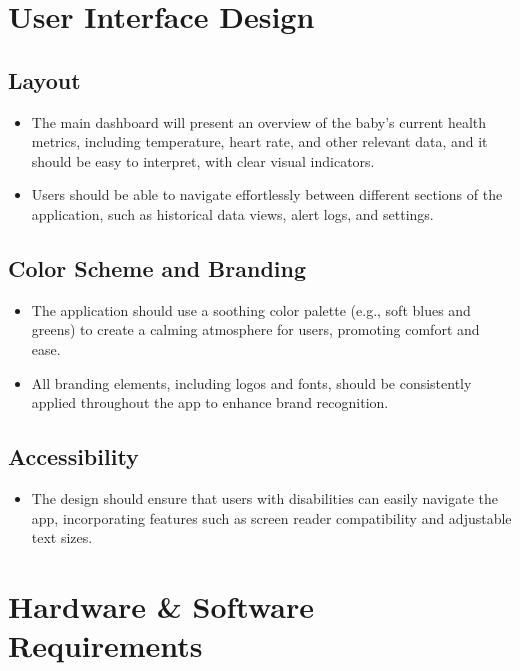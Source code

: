 \documentclass[12pt,a4paper]{report}
\begin{document}
\section{User Interface Design}

\subsection{Layout}
\begin{itemize}
  \item The main dashboard will present an overview of the baby's current health metrics, including temperature, heart rate, and other relevant data, and it should be easy to interpret, with clear visual indicators.
  \item Users should be able to navigate effortlessly between different sections of the application, such as historical data views, alert logs, and settings.
\end{itemize}

\subsection{Color Scheme and Branding}
\begin{itemize}
  \item The application should use a soothing color palette (e.g., soft blues and greens) to create a calming atmosphere for users, promoting comfort and ease.
  \item All branding elements, including logos and fonts, should be consistently applied throughout the app to enhance brand recognition.
\end{itemize}

\subsection{Accessibility}
\begin{itemize}
  \item The design should ensure that users with disabilities can easily navigate the app, incorporating features such as screen reader compatibility and adjustable text sizes.
\end{itemize}

\section{Hardware \& Software Requirements}
\end{document}

